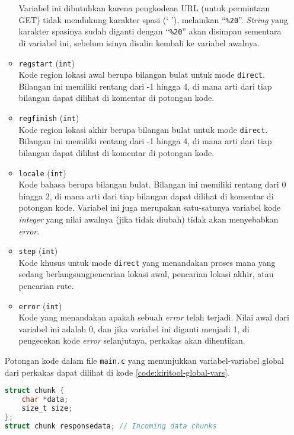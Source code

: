 \begin{itemize}[listparindent=\parindent]
\begin{itemize}
		Variabel ini dibutuhkan karena pengkodean URL (untuk permintaan GET) tidak mendukung karakter spasi (` '), melainkan ``\verb|%20|''. \textit{String} yang karakter spasinya sudah diganti dengan ``\verb|%20|'' akan disimpan sementara di variabel ini, sebelum isinya disalin kembali ke variabel awalnya.
		\item \verb|regstart| (\verb|int|) \\
		Kode region lokasi awal berupa bilangan bulat untuk mode \verb|direct|. Bilangan ini memiliki rentang dari -1 hingga 4, di mana arti dari tiap bilangan dapat dilihat di komentar di potongan kode.
		\item \verb|regfinish| (\verb|int|) \\
		Kode region lokasi akhir berupa bilangan bulat untuk mode \verb|direct|. Bilangan ini memiliki rentang dari -1 hingga 4, di mana arti dari tiap bilangan dapat dilihat di komentar di potongan kode.
		\item \verb|locale| (\verb|int|) \\
		Kode bahasa berupa bilangan bulat. Bilangan ini memiliki rentang dari 0 hingga 2, di mana arti dari tiap bilangan dapat dilihat di komentar di potongan kode. Variabel ini juga merupakan satu-satunya variabel kode \textit{integer} yang nilai awalnya (jika tidak diubah) tidak akan menyebabkan \textit{error}.
		\item \verb|step| (\verb|int|) \\
		Kode khusus untuk mode \verb|direct| yang menandakan proses mana yang sedang berlangsung\textemdash pencarian lokasi awal, pencarian lokasi akhir, atau pencarian rute.
		\item \verb|error| (\verb|int|) \\
		Kode yang menandakan apakah sebuah \textit{error} telah terjadi. Nilai awal dari variabel ini adalah 0, dan jika variabel ini diganti menjadi 1, di pengecekan kode \textit{error} selanjutnya, perkakas akan dihentikan.
	\end{itemize}
	\noindent
	Potongan kode dalam file \verb|main.c| yang menunjukkan variabel-variabel global dari perkakas dapat dilihat di kode \ref{code:kiritool-global-vars}.
	
	\begin{lstlisting}[language=C, caption=Variabel global perkakas \cl KIRI, label=code:kiritool-global-vars]
struct chunk {
    char *data;
    size_t size;
};
struct chunk responsedata; // Incoming data chunks


\end{lstlisting}
\end{itemize}
